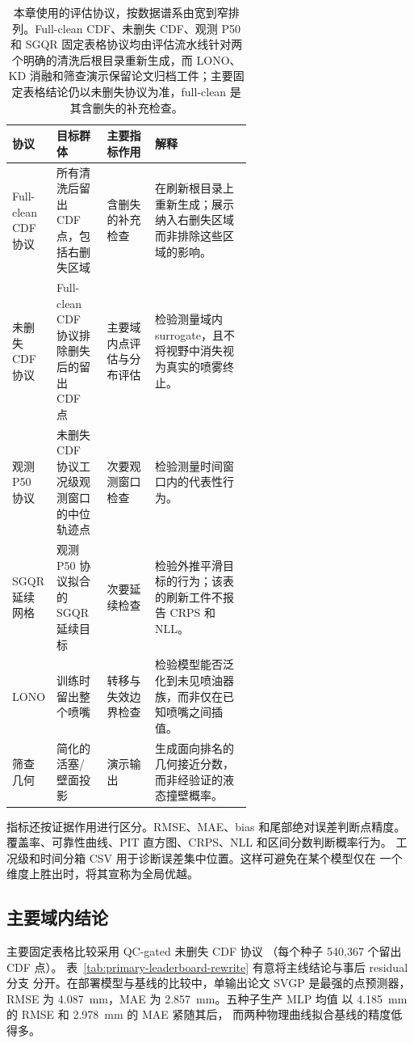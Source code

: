 \begin{table}[t]
\centering
\footnotesize
\setlength{\tabcolsep}{4pt}
\begin{tabularx}{\linewidth}{@{}L{0.18\linewidth}L{0.21\linewidth}L{0.20\linewidth}Y@{}}
\toprule
协议 & 目标群体 & 主要指标作用 & 解释 \\
\midrule
Full-clean CDF 协议 & 所有清洗后留出 CDF 点，包括右删失区域 & 含删失的补充检查 & 在刷新根目录上重新生成；展示纳入右删失区域而非排除这些区域的影响。 \\
未删失 CDF 协议 & Full-clean CDF 协议排除删失后的留出 CDF 点 & 主要域内点评估与分布评估 & 检验测量域内 surrogate，且不将视野中消失视为真实的喷雾终止。 \\
观测 P50 协议 & 未删失 CDF 协议工况级观测窗口的中位轨迹点 & 次要观测窗口检查 & 检验测量时间窗口内的代表性行为。 \\
SGQR 延续网格 & 观测 P50 协议拟合的 SGQR 延续目标 & 次要延续检查 & 检验外推平滑目标的行为；该表的刷新工件不报告 CRPS 和 NLL。 \\
LONO & 训练时留出整个喷嘴 & 转移与失效边界检查 & 检验模型能否泛化到未见喷油器族，而非仅在已知喷嘴之间插值。 \\
筛查几何 & 简化的活塞/壁面投影 & 演示输出 & 生成面向排名的几何接近分数，而非经验证的液态撞壁概率。 \\
\bottomrule
\end{tabularx}
\caption{本章使用的评估协议，按数据谱系由宽到窄排列。Full-clean CDF、未删失 CDF、观测 P50 和 SGQR 固定表格协议均由评估流水线针对两个明确的清洗后根目录重新生成，而 LONO、KD 消融和筛查演示保留论文归档工件；主要固定表格结论仍以未删失协议为准，full-clean 是其含删失的补充检查。}
\label{tab:protocol-map-rewrite}
\end{table}

指标还按证据作用进行区分。RMSE、MAE、bias 和尾部绝对误差判断点精度。
覆盖率、可靠性曲线、PIT 直方图、CRPS、NLL 和区间分数判断概率行为。
工况级和时间分箱 CSV 用于诊断误差集中位置。这样可避免在某个模型仅在
一个维度上胜出时，将其宣称为全局优越。

\subsection{主要域内结论}
\label{sec:primary-in-domain-verdict}
\label{sec:in-domain-accuracy-en}
\label{sec:in-domain-accuracy-zh}

主要固定表格比较采用 QC-gated 未删失 CDF 协议
（每个种子 540{,}367 个留出 CDF 点）。
表~\ref{tab:primary-leaderboard-rewrite} 有意将主线结论与事后 residual 分支
分开。在部署模型与基线的比较中，单输出论文 SVGP 是最强的点预测器，
RMSE 为 \SI{4.087}{mm}，MAE 为 \SI{2.857}{mm}。五种子生产 MLP 均值
以 \SI{4.185}{mm} 的 RMSE 和 \SI{2.978}{mm} 的 MAE 紧随其后，
而两种物理曲线拟合基线的精度低得多。

